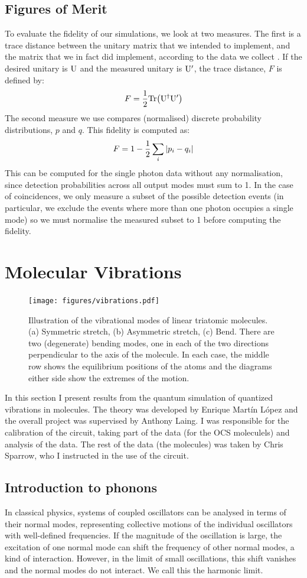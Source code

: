\subsection{Figures of Merit}
To evaluate the fidelity of our simulations, we look at two measures. The first
is a trace distance between the unitary matrix that we intended to implement,
and the matrix that we in fact did implement, according to the data we collect
\cite{sst}. If the desired unitary is \(\mathrm{U}\) and the measured unitary
is \(\mathrm{U^{\prime}}\), the trace distance, \(F\) is defined by:
\[F=\frac{1}{2}\mathrm{Tr}\!\left(\mathrm{U}^{\dagger}{\mathrm{U}^{\prime}}\right)\]
The second measure we use compares (normalised) discrete probability
distributions, \(p\) and \(q\). This fidelity is computed as:
\[F=1-\frac{1}{2}\sum_{i}\left|p_{i}-q_{i}\right|\]
This can be computed for the single photon data without any normalisation, since
detection probabilities across all output modes must sum to 1. In the case of
coincidences, we only measure a subset of the possible detection events (in
particular, we exclude the events where more than one photon occupies a single
mode) so we must normalise the measured subset to 1 before computing the
fidelity.

\section{Molecular Vibrations}
\label{sec:Molecules}
\begin{figure}[h]
  \centering
  \texttt{[image: figures/vibrations.pdf]}
  \caption[Vibrational modes of linear triatomic molecules]
  {Illustration of the vibrational modes of linear triatomic molecules. (a)
  Symmetric stretch, (b) Asymmetric stretch, (c) Bend. There are two
  (degenerate) bending modes, one in each of the two directions perpendicular to
  the axis of the molecule. In each case, the middle row shows the equilibrium
  positions of the atoms and the diagrams either side show the extremes of the
  motion.}
  \label{fig:vibrations}
\end{figure}
In this section I present results from the quantum simulation of quantized
vibrations in molecules. The theory was developed by Enrique Mart\'in L\'opez
and the overall project was supervised by Anthony Laing. I was responsible for
the calibration of the circuit, taking part of the data (for the OCS moleculels)
and analysis of the data. The rest of the data (the \co{} molecules) was taken
by Chris Sparrow, who I instructed in the use of the circuit.

\subsection{Introduction to phonons}
\label{sec:Phonons}
In classical physics, systems of coupled oscillators can be analysed in terms of
their normal modes, representing collective motions of the individual
oscillators with well-defined frequencies. If the magnitude of the oscillation
is large, the excitation of one normal mode can shift the frequency of other
normal modes, a kind of interaction. However, in the limit of small
oscillations, this shift vanishes and the normal modes do not interact. We call
this the harmonic limit.

